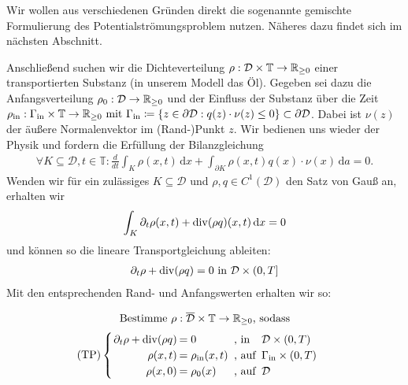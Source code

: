 \begin{Bemerkung}
	Wir wollen aus verschiedenen Gründen direkt die sogenannte gemischte Formulierung des Potentialströmungsproblem nutzen. Näheres dazu findet sich im nächsten Abschnitt.
\end{Bemerkung}
Anschließend suchen wir die Dichteverteilung $\rho: \mathcal{D} \times \mathbb{T} \rightarrow \mathbb{R}_{\geq0} $ einer transportierten Substanz (in unserem Modell das Öl).  \newline
Gegeben sei dazu die Anfangsverteilung $\rho_0: \mathcal{D} \rightarrow \mathbb{R}_{\geq0}$ und der Einfluss der Substanz über die Zeit
$
\rho_{\text{in}} : \Gamma_{\text{in}} \times \mathbb{T} \rightarrow \mathbb{R}_{\geq0} \text{ mit }  \Gamma_{\text{in}} \coloneqq  \{ z \in \partial \mathcal{D}: q(z)\cdot \nu(z) \leq 0 \} \subset  \partial \mathcal{D}
$.
Dabei ist $\nu(z)$ der äußere Normalenvektor im (Rand-)Punkt $z$.
Wir bedienen uns wieder der Physik und fordern die Erfüllung der Bilanzgleichung
\begin{align*}
\forall K \subseteq \mathcal{D} , t\in \mathbb{T} : \frac{d}{dt} \int_K \rho(x,t) \, \mathrm{d}x + \int_{\partial K} \rho(x,t)q(x)\cdot \nu(x) \, \mathrm{d}a = 0.
\end{align*}
Wenden wir für ein zulässiges $K \subseteq \mathcal{D}$ und $\rho,q \in C^1(\mathcal{D})$ den Satz von Gauß an, erhalten wir
\begin{align*}
\int_K \partial_t \rho(x,t) + \operatorname{div} (\rho q)(x,t) \, \mathrm{d}x = 0
\end{align*}
und können so die lineare Transportgleichung ableiten:
\begin{align*}
\partial_t \rho + \operatorname{div} (\rho q) = 0 \text{ in } \mathcal{D} \times (0,T]
\end{align*}
Mit den entsprechenden Rand- und Anfangswerten erhalten wir so:

\[ 
\text{Bestimme } \rho: \overline{\mathcal{D}} \times \mathbb{T} \to \R_{\geq 0} \text{, sodass} \newline \]
\[\setlength\arraycolsep{1pt}
\text{(TP)}\begin{cases} 
\begin{array}{rlll}
\partial_t \rho + \dive(\rho q) &= 0 &\text{ , in } &\mathcal{D} \times (0,T)\\
\rho(x,t) &= \rho_{\text{in}}(x,t) &\text{ , auf } &\Gamma_{\text{in}} \times (0,T)\\
\rho(x,0) &= \rho_0(x) &\text{ , auf } &\mathcal{D} \\
\end{array}
\end{cases} \\
\]

